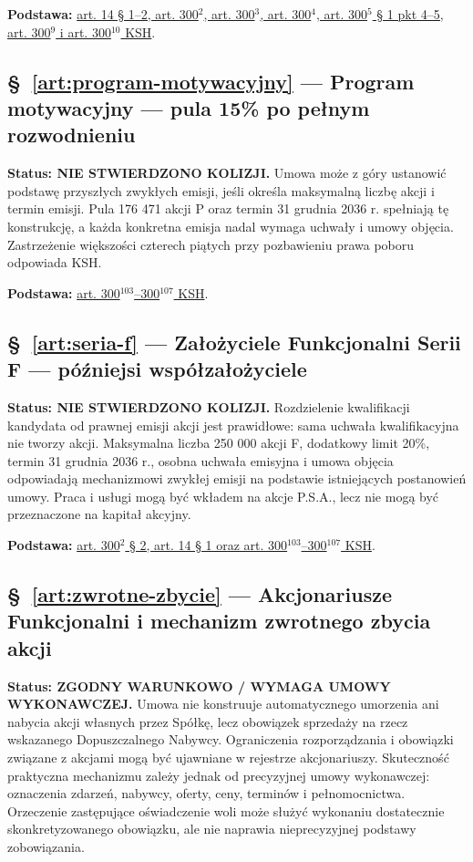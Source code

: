 \documentclass[12pt,a4paper]{report}
\begin{document}
\textbf{Podstawa:} \href{https://eli.gov.pl/api/acts/DU/2024/18/text.html}{art. 14 § 1--2, art. 300$^{2}$, art. 300$^{3}$, art. 300$^{4}$, art. 300$^{5}$ § 1 pkt 4--5, art. 300$^{9}$ i art. 300$^{10}$ KSH}.

\subsection*{§~\ref{art:program-motywacyjny} — Program motywacyjny — pula 15\% po pełnym rozwodnieniu}
\textbf{Status: NIE STWIERDZONO KOLIZJI.} Umowa może z góry ustanowić podstawę przyszłych zwykłych emisji, jeśli określa maksymalną liczbę akcji i termin emisji. Pula 176 471 akcji P oraz termin 31 grudnia 2036 r. spełniają tę konstrukcję, a każda konkretna emisja nadal wymaga uchwały i umowy objęcia. Zastrzeżenie większości czterech piątych przy pozbawieniu prawa poboru odpowiada KSH.

\textbf{Podstawa:} \href{https://eli.gov.pl/api/acts/DU/2024/18/text.html}{art. 300$^{103}$--300$^{107}$ KSH}.

\subsection*{§~\ref{art:seria-f} — Założyciele Funkcjonalni Serii F — późniejsi współzałożyciele}
\textbf{Status: NIE STWIERDZONO KOLIZJI.} Rozdzielenie kwalifikacji kandydata od prawnej emisji akcji jest prawidłowe: sama uchwała kwalifikacyjna nie tworzy akcji. Maksymalna liczba 250 000 akcji F, dodatkowy limit 20\%, termin 31 grudnia 2036 r., osobna uchwała emisyjna i umowa objęcia odpowiadają mechanizmowi zwykłej emisji na podstawie istniejących postanowień umowy. Praca i usługi mogą być wkładem na akcje P.S.A., lecz nie mogą być przeznaczone na kapitał akcyjny.

\textbf{Podstawa:} \href{https://eli.gov.pl/api/acts/DU/2024/18/text.html}{art. 300$^{2}$ § 2, art. 14 § 1 oraz art. 300$^{103}$--300$^{107}$ KSH}.

\subsection*{§~\ref{art:zwrotne-zbycie} — Akcjonariusze Funkcjonalni i mechanizm zwrotnego zbycia akcji}
\textbf{Status: ZGODNY WARUNKOWO / WYMAGA UMOWY WYKONAWCZEJ.} Umowa nie konstruuje automatycznego umorzenia ani nabycia akcji własnych przez Spółkę, lecz obowiązek sprzedaży na rzecz wskazanego Dopuszczalnego Nabywcy. Ograniczenia rozporządzania i obowiązki związane z akcjami mogą być ujawniane w rejestrze akcjonariuszy. Skuteczność praktyczna mechanizmu zależy jednak od precyzyjnej umowy wykonawczej: oznaczenia zdarzeń, nabywcy, oferty, ceny, terminów i pełnomocnictwa. Orzeczenie zastępujące oświadczenie woli może służyć wykonaniu dostatecznie skonkretyzowanego obowiązku, ale nie naprawia nieprecyzyjnej podstawy zobowiązania.
\end{document}
